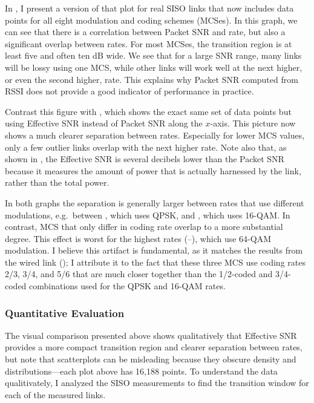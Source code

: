 In , I present a version of that plot for real SISO links that now includes data points for all eight modulation and coding schemes (MCSes). In this graph, we can see that there is a correlation between Packet SNR and rate, but also a significant overlap between rates. For most MCSes, the transition region is at least five and often ten dB wide. We see that for a large SNR range, many links will be lossy using one MCS, while other links will work well at the next higher, or even the second higher, rate. This explains why Packet SNR computed from RSSI does not provide a good indicator of performance in practice.

Contrast this figure with , which shows the exact same set of data points but using Effective SNR instead of Packet SNR along the $x$-axis. This picture now shows a much clearer separation between rates. Especially for lower MCS values, only a few outlier links overlap with the next higher rate. Note also that, as shown in , the Effective SNR is several decibels lower than the Packet SNR because it measures the amount of power that is actually harnessed by the link, rather than the total power.

In both graphs the separation is generally larger between rates that use different modulations, e.g.\ between , which uses QPSK, and , which uses 16-QAM. In contrast, MCS that only differ in coding rate overlap to a more substantial degree. This effect is worst for the highest rates (--), which use 64-QAM modulation. I believe this artifact is fundamental, as it matches the results from the wired link (); I attribute it to the fact that these three MCS use coding rates 2/3, 3/4, and 5/6 that are much closer together than the 1/2-coded and 3/4-coded combinations used for the QPSK and 16-QAM rates.

\subsubsection{Quantitative Evaluation}
The visual comparison presented above shows qualitatively that Effective SNR provides a more compact transition region and clearer separation between rates, but note that scatterplots can be misleading because they obscure density and distributions---each plot above has 16,188 points. To understand the data qualitivately, I analyzed the SISO measurements to find the transition window for each of the measured links.

